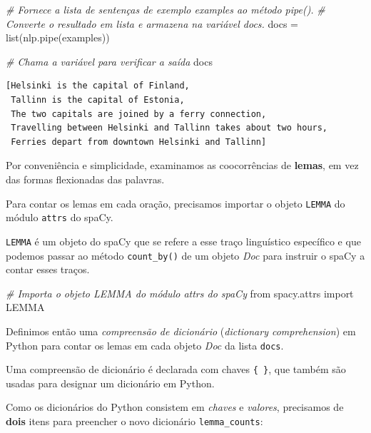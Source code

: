 \documentclass[
  brazilian,
]{article}
\newenvironment{Shaded}{}{}
\newcommand{\BuiltInTok}[1]{#1}
\newcommand{\CommentTok}[1]{\textcolor[rgb]{0.38,0.63,0.69}{\textit{#1}}}
\newcommand{\ImportTok}[1]{#1}
\newcommand{\NormalTok}[1]{#1}
\newcommand{\OperatorTok}[1]{\textcolor[rgb]{0.40,0.40,0.40}{#1}}
\begin{document}
\begin{Shaded}
\begin{Highlighting}[]
\CommentTok{\# Fornece a lista de sentenças de exemplo \textquotesingle{}examples\textquotesingle{} ao método pipe().}
\CommentTok{\# Converte o resultado em lista e armazena na variável \textquotesingle{}docs\textquotesingle{}.}
\NormalTok{docs }\OperatorTok{=} \BuiltInTok{list}\NormalTok{(nlp.pipe(examples))}

\CommentTok{\# Chama a variável para verificar a saída}
\NormalTok{docs}
\end{Highlighting}
\end{Shaded}

\begin{verbatim}
[Helsinki is the capital of Finland,
 Tallinn is the capital of Estonia,
 The two capitals are joined by a ferry connection,
 Travelling between Helsinki and Tallinn takes about two hours,
 Ferries depart from downtown Helsinki and Tallinn]
\end{verbatim}

Por conveniência e simplicidade, examinamos as coocorrências de
\textbf{lemas}, em vez das formas flexionadas das palavras.

Para contar os lemas em cada oração, precisamos importar o objeto
\texttt{LEMMA} do módulo \texttt{attrs} do spaCy.

\texttt{LEMMA} é um objeto do spaCy que se refere a esse traço
linguístico específico e que podemos passar ao método
\texttt{count\_by()} de um objeto \emph{Doc} para instruir o spaCy a
contar esses traços.

\begin{Shaded}
\begin{Highlighting}[]
\CommentTok{\# Importa o objeto LEMMA do módulo \textquotesingle{}attrs\textquotesingle{} do spaCy}
\ImportTok{from}\NormalTok{ spacy.attrs }\ImportTok{import}\NormalTok{ LEMMA}
\end{Highlighting}
\end{Shaded}

Definimos então uma \emph{compreensão de dicionário} (\emph{dictionary
comprehension}) em Python para contar os lemas em cada objeto \emph{Doc}
da lista \texttt{docs}.

Uma compreensão de dicionário é declarada com chaves \texttt{\{\ \}},
que também são usadas para designar um dicionário em Python.

Como os dicionários do Python consistem em \emph{chaves} e
\emph{valores}, precisamos de \textbf{dois} itens para preencher o novo
dicionário \texttt{lemma\_counts}:
\end{document}
